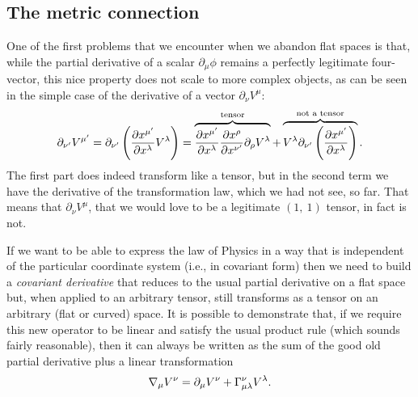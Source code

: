 \subsection{The metric connection}

One of the first problems that we encounter when we abandon flat spaces is that,
while the partial derivative of a scalar $\partial_\mu \phi$ remains a perfectly
legitimate four-vector, this nice property does not scale to more complex objects,
as can be seen in the simple case of the derivative of a vector $\partial_\nu V^\mu$:
\begin{align*}
  \partial_{\nu'} V^{\mu'} =
  \partial_{\nu'} \left( \pdv{x^{\mu'}}{x^\lambda} V^\lambda \right) =
  \overbrace{\pdv{x^{\mu'}}{x^\lambda} \pdv{x^{\rho}}{x^{\nu'}} \partial_{\rho} V^\lambda}^{\text{tensor}} +
  \overbrace{V^\lambda \partial_{\nu'} \left( \pdv{x^{\mu'}}{x^\lambda} \right)}^{\text{not a tensor}}.
\end{align*}
The first part does indeed transform like a tensor, but in the second term we have
the derivative of the transformation law, which we had not see, so far. That means
that $\partial_\nu V^\mu$, that we would love to be a legitimate $(1,~1)$ tensor,
in fact is not.

If we want to be able to express the law of Physics in a way that is independent
of the particular coordinate system (i.e., in covariant form) then we need to build
a \emph{covariant derivative} that reduces to the usual partial derivative on a
flat space but, when applied to an arbitrary tensor, still transforms as a tensor
on an arbitrary (flat or curved) space.
It is possible to demonstrate that, if we require this new operator to be linear
and satisfy the usual product rule (which sounds fairly reasonable), then it can always be written as the sum of the good old partial derivative
plus a linear transformation
\begin{align}
  \nabla_\mu V^\nu = \partial_{\mu} V^\nu + \Gamma^{\nu}_{\mu\lambda}V^\lambda.
\end{align}

